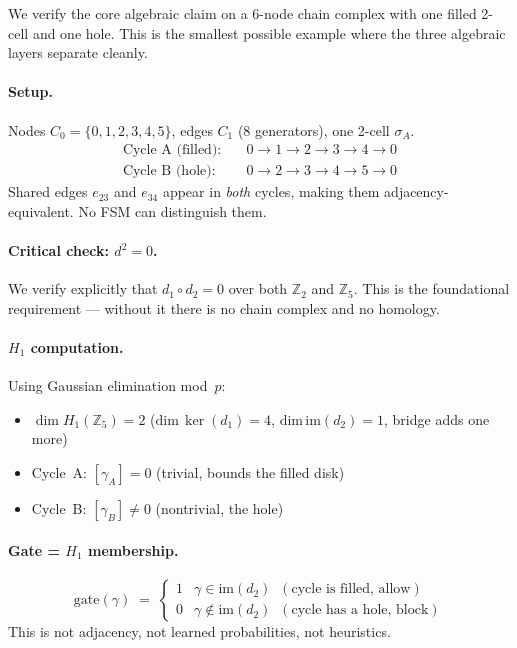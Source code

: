 \documentclass[11pt,a4paper]{article}
\begin{document}
We verify the core algebraic claim on a 6-node chain complex
with one filled 2-cell and one hole.
This is the smallest possible example where the three algebraic
layers separate cleanly.

\paragraph{Setup.}
Nodes $C_0=\{0,1,2,3,4,5\}$, edges $C_1$ (8 generators), one 2-cell $\sigma_A$.
\begin{align*}
\text{Cycle A (filled):}\quad &0\to1\to2\to3\to4\to0 \\
\text{Cycle B (hole):}\quad   &0\to2\to3\to4\to5\to0
\end{align*}
Shared edges $e_{23}$ and $e_{34}$ appear in \emph{both} cycles,
making them adjacency-equivalent.
No FSM can distinguish them.

\paragraph{Critical check: $d^2=0$.}
We verify explicitly that $d_1 \circ d_2 = 0$ over both $\mathbb{Z}_2$
and $\mathbb{Z}_5$.
This is the foundational requirement --- without it there is no chain
complex and no homology.

\paragraph{$H_1$ computation.}
Using Gaussian elimination mod~$p$:
\begin{itemize}
  \item $\dim H_1(\mathbb{Z}_5) = 2$
        ($\text{dim}\,\ker(d_1)=4$, $\text{dim}\,\mathrm{im}(d_2)=1$, bridge adds one more)
  \item Cycle~A: $[\gamma_A] = 0$ (trivial, bounds the filled disk)
  \item Cycle~B: $[\gamma_B] \neq 0$ (nontrivial, the hole)
\end{itemize}

\paragraph{Gate = $H_1$ membership.}
\[
\mathrm{gate}(\gamma) \;=\;
\begin{cases}
1 & \gamma \in \mathrm{im}(d_2) \;\;(\text{cycle is filled, allow}) \\
0 & \gamma \notin \mathrm{im}(d_2) \;\;(\text{cycle has a hole, block})
\end{cases}
\]
This is not adjacency, not learned probabilities, not heuristics.
\end{document}
